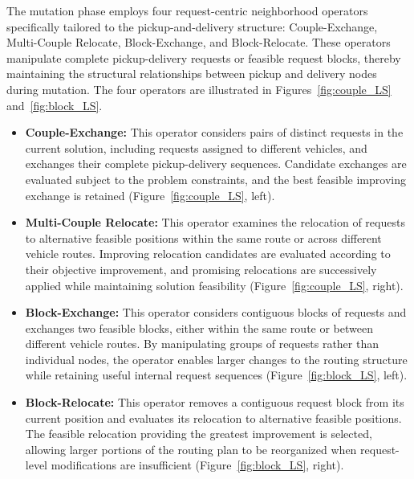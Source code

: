 \documentclass[pdflatex]{sn-jnl}
\begin{document}
The mutation phase employs four request-centric neighborhood operators specifically tailored to the pickup-and-delivery structure: Couple-Exchange, Multi-Couple Relocate, Block-Exchange, and Block-Relocate. These operators manipulate complete pickup-delivery requests or feasible request blocks, thereby maintaining the structural relationships between pickup and delivery nodes during mutation. The four operators are illustrated in Figures~\ref{fig:couple_LS} and~\ref{fig:block_LS}.

\begin{itemize}
    \item \textbf{Couple-Exchange:} This operator considers pairs of distinct requests in the current solution, including requests assigned to different vehicles, and exchanges their complete pickup-delivery sequences. Candidate exchanges are evaluated subject to the problem constraints, and the best feasible improving exchange is retained (Figure~\ref{fig:couple_LS}, left).

    \item \textbf{Multi-Couple Relocate:} This operator examines the relocation of requests to alternative feasible positions within the same route or across different vehicle routes. Improving relocation candidates are evaluated according to their objective improvement, and promising relocations are successively applied while maintaining solution feasibility (Figure~\ref{fig:couple_LS}, right).

    \item \textbf{Block-Exchange:} This operator considers contiguous blocks of requests and exchanges two feasible blocks, either within the same route or between different vehicle routes. By manipulating groups of requests rather than individual nodes, the operator enables larger changes to the routing structure while retaining useful internal request sequences (Figure~\ref{fig:block_LS}, left).

    \item \textbf{Block-Relocate:} This operator removes a contiguous request block from its current position and evaluates its relocation to alternative feasible positions. The feasible relocation providing the greatest improvement is selected, allowing larger portions of the routing plan to be reorganized when request-level modifications are insufficient (Figure~\ref{fig:block_LS}, right).
\end{itemize}
\end{document}
